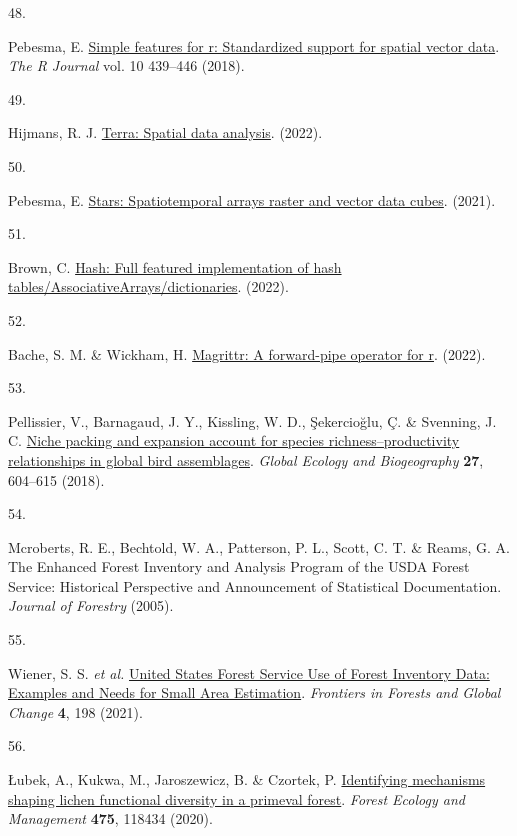 \documentclass[
  10pt,
]{article}
\newlength{\cslhangindent}
\newlength{\csllabelwidth}
\newlength{\cslentryspacingunit} %
\newenvironment{CSLReferences}[2] %
 {%
  \setlength{\parindent}{0pt}
  \ifodd #1
  \let\oldpar\par
  \def\par{\hangindent=\cslhangindent\oldpar}
  \fi
  \setlength{\parskip}{#2\cslentryspacingunit}
 }%
 {}
\newcommand{\CSLLeftMargin}[1]{\parbox[t]{\csllabelwidth}{#1}}
\newcommand{\CSLRightInline}[1]{\parbox[t]{\linewidth - \csllabelwidth}{#1}\break}
\begin{document}
\begin{CSLReferences}{0}{0}
\leavevmode{}%
\CSLLeftMargin{48. }
\CSLRightInline{Pebesma, E. \href{https://doi.org/10.32614/RJ-2018-009}{Simple features for r: Standardized support for spatial vector data}. \emph{The R Journal} vol. 10 439--446 (2018).}

\leavevmode{}%
\CSLLeftMargin{49. }
\CSLRightInline{Hijmans, R. J. \href{https://CRAN.R-project.org/package=terra}{Terra: Spatial data analysis}. (2022).}

\leavevmode{}%
\CSLLeftMargin{50. }
\CSLRightInline{Pebesma, E. \href{https://CRAN.R-project.org/package=stars}{Stars: Spatiotemporal arrays raster and vector data cubes}. (2021).}

\leavevmode{}%
\CSLLeftMargin{51. }
\CSLRightInline{Brown, C. \href{https://CRAN.R-project.org/package=hash}{Hash: Full featured implementation of hash tables/AssociativeArrays/dictionaries}. (2022).}

\leavevmode{}%
\CSLLeftMargin{52. }
\CSLRightInline{Bache, S. M. \& Wickham, H. \href{https://CRAN.R-project.org/package=magrittr}{Magrittr: A forward-pipe operator for r}. (2022).}

\leavevmode{}%
\CSLLeftMargin{53. }
\CSLRightInline{Pellissier, V., Barnagaud, J. Y., Kissling, W. D., Şekercioğlu, Ç. \& Svenning, J. C. \href{https://doi.org/10.1111/GEB.12723}{{Niche packing and expansion account for species richness--productivity relationships in global bird assemblages}}. \emph{Global Ecology and Biogeography} \textbf{27}, 604--615 (2018).}

\leavevmode{}%
\CSLLeftMargin{54. }
\CSLRightInline{Mcroberts, R. E., Bechtold, W. A., Patterson, P. L., Scott, C. T. \& Reams, G. A. {The Enhanced Forest Inventory and Analysis Program of the USDA Forest Service: Historical Perspective and Announcement of Statistical Documentation}. \emph{Journal of Forestry} (2005).}

\leavevmode{}%
\CSLLeftMargin{55. }
\CSLRightInline{Wiener, S. S. \emph{et al.} \href{https://doi.org/10.3389/FFGC.2021.763487/BIBTEX}{{United States Forest Service Use of Forest Inventory Data: Examples and Needs for Small Area Estimation}}. \emph{Frontiers in Forests and Global Change} \textbf{4}, 198 (2021).}

\leavevmode{}%
\CSLLeftMargin{56. }
\CSLRightInline{Łubek, A., Kukwa, M., Jaroszewicz, B. \& Czortek, P. \href{https://doi.org/10.1016/J.FORECO.2020.118434}{{Identifying mechanisms shaping lichen functional diversity in a primeval forest}}. \emph{Forest Ecology and Management} \textbf{475}, 118434 (2020).}


\end{CSLReferences}
\end{document}
